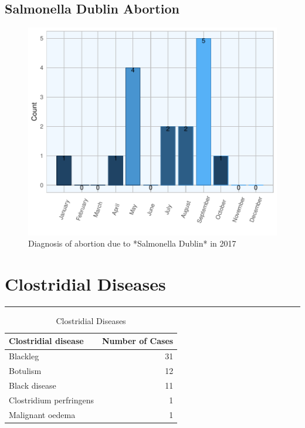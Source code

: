 \documentclass[]{book}
\begin{document}
\section{Salmonella Dublin Abortion}\label{salmonella-dublin-abortion}

\begin{figure}

{\centering \includegraphics{AFBI_files/figure-latex/salm1-1} 

}

\caption{Diagnosis of abortion due to *Salmonella Dublin* in 2017}\label{fig:salm1}
\end{figure}

\chapter{Clostridial Diseases}\label{clostridial-diseases}

\begin{center}\rule{0.5\linewidth}{\linethickness}\end{center}

\begin{table}

\caption{\label{tab:unnamed-chunk-40}Clostridial Diseases}
\centering
\begin{tabular}[t]{l|r}
\hline
Clostridial disease & Number of Cases\\
\hline
Blackleg & 31\\
\hline
Botulism & 12\\
\hline
Black disease & 11\\
\hline
Clostridium perfringens & 1\\
\hline
Malignant oedema & 1\\
\hline
\end{tabular}
\end{table}
\end{document}
